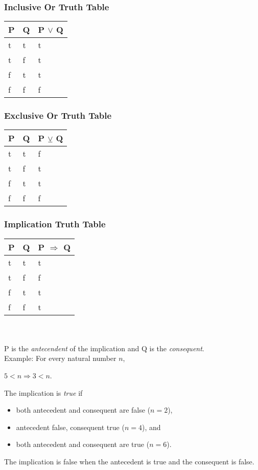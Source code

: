 \documentclass[11pt]{article}
\begin{document}
\subsubsection*{Inclusive Or Truth Table}
\begin{tabular}{|l|l|l|}
\hline
	\textbf{P} & \textbf{Q} & \textbf{P} $\lor$ \textbf{Q}\\
\hline
	t & t & t\\
\hline
	t & f & t\\
\hline
	f & t & t\\
\hline
	f & f & f\\
\hline
\end{tabular}

\subsubsection*{Exclusive Or Truth Table}
\begin{tabular}{|l|l|l|}
\hline
	\textbf{P} & \textbf{Q} & \textbf{P} $\veebar$ \textbf{Q}\\
\hline
	t & t & f\\
\hline
	t & f & t\\
\hline
	f & t & t\\
\hline
	f & f & f\\
\hline
\end{tabular}

\subsubsection*{Implication Truth Table}
\begin{tabular}{|l|l|l|}
\hline
	\textbf{P} & \textbf{Q} & \textbf{P} $\Rightarrow$ \textbf{Q}\\
\hline
	t & t & t\\
\hline
	t & f & f\\
\hline
	f & t & t\\
\hline
	f & f & t\\
\hline
\end{tabular}
\\\\
P is the \textit{antecendent} of the implication and Q is the \textit{consequent}. \\ Example: For every natural number $n$, \begin{center}$5 < n \Rightarrow 3 < n$.\end{center} The implication is \emph{true} if
\begin{itemize}
\item both antecedent and consequent are false ($n = 2$),
\item antecedent false, consequent true ($n=4$), and
\item both antecedent and consequent are true ($n=6$).
\end{itemize}
The implication is false when the antecedent is true and the consequent is false. 
\end{document}
